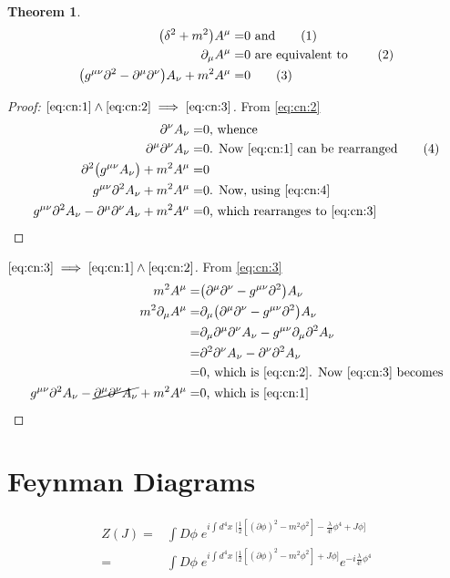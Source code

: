 \documentclass[]{article}
\newcommand\numberthis{\addtocounter{equation}{1}\tag{\theequation}}
\newtheorem{thm}{Theorem}
\begin{document}
\begin{thm}
	\begin{align*}
		\big(\delta^2+m^2\big) A^{\mu}=&0 \text{ and} \numberthis \label{eq:cn:1}\\
		 \partial_{\mu} A^{\mu}=&0 \text{ are equivalent to } \numberthis \label{eq:cn:2}\\
		 \big(g^{\mu\nu}\partial^2-\partial^\mu\partial^\nu\big)A_\nu + m^2 A^\mu=&0 \numberthis \label{eq:cn:3}
	\end{align*}
\end{thm}
\begin{proof}[Proof: $\eqref{eq:cn:1} \land \eqref{eq:cn:2} \implies \eqref{eq:cn:3}$]
	 From	\eqref{eq:cn:2} 
	\begin{align*}
		 \partial^\nu A_\nu =& 0 \text{, whence}\\
		 \partial^\mu \partial^\nu A_\nu =& 0 \text{. Now \eqref{eq:cn:1} can be rearranged} \numberthis \label{eq:cn:4}\\
		 \partial^2 \big(g^{\mu\nu}A_\nu\big) + m^2 A^\mu =&0\\
		 g^{\mu\nu} \partial^2 A_\nu + m^2 A^\mu =&0 \text{. Now, using \eqref{eq:cn:4}}\\
		 g^{\mu\nu} \partial^2 A_\nu - \partial^\mu \partial^\nu A_\nu + m^2 A^\mu =&0 \text{, which rearranges to \eqref{eq:cn:3}}
	\end{align*}
\end{proof}
\begin{proof}[$\eqref{eq:cn:3} \implies \eqref{eq:cn:1} \land \eqref{eq:cn:2}$]
	From \eqref{eq:cn:3}
	\begin{align*}
	 	m^2 A^\mu=&\big(\partial^\mu\partial^\nu-g^{\mu\nu}\partial^2\big)A_\nu \\
	 	m^2 \partial_\mu A^\mu =&\partial_\mu \big(\partial^\mu\partial^\nu-g^{\mu\nu}\partial^2\big)A_\nu\\
	 	=&\partial_\mu\partial^\mu\partial^\nu A_\nu -  g^{\mu\nu}\partial_\mu\partial^2A_\nu\\
	 	=&\partial^2\partial^\nu A_\nu - \partial^\nu\partial^2A_\nu\\
	 	=& 0 \text{, which is \eqref{eq:cn:2}. Now \eqref{eq:cn:3} becomes}\\
	 	g^{\mu\nu}\partial^2 A_\nu-\cancel{\partial^\mu\partial^\nu A_\nu} + m^2 A^\mu=&0 \text{, which is \eqref{eq:cn:1}}
	\end{align*}
\end{proof}

\section{Feynman Diagrams}

\begin{align*}
	Z(J) =& \int D\phi \; e^{i\int d^4x\;\big[\frac{1}{2}[(\partial \phi)^2-m^2\phi^2]-\frac{\lambda}{4!}\phi^4+J\phi\big]}\\
	=& \int D\phi \; e^{i\int d^4x\;\big[\frac{1}{2}[(\partial \phi)^2-m^2\phi^2]+J\phi\big]}e^{-i\frac{\lambda}{4!}\phi^4}
\end{align*}

\raggedright

\end{document}
